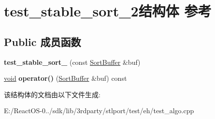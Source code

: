 \hypertarget{structtest__stable__sort__2}{}\section{test\+\_\+stable\+\_\+sort\+\_\+2结构体 参考}
\label{structtest__stable__sort__2}
\subsection*{Public 成员函数}
\begin{DoxyCompactItemize}
\item 
\mbox{\label{structtest__stable__sort__2_a55782d01e475b58a440b69eed7bc63c5}} 
{\bfseries test\+\_\+stable\+\_\+sort\+\_} (const \hyperlink{struct_sort_buffer}{Sort\+Buffer} \&buf)
\item 
\mbox{\label{structtest__stable__sort__2_a0bed304901fde94d605bf1c1e7b0079e}} 
\hyperlink{interfacevoid}{void} {\bfseries operator()} (\hyperlink{struct_sort_buffer}{Sort\+Buffer} \&buf) const
\end{DoxyCompactItemize}


该结构体的文档由以下文件生成\+:\begin{DoxyCompactItemize}
\item 
E\+:/\+React\+O\+S-\/0../sdk/lib/3rdparty/stlport/test/eh/test\+\_\+algo.\+cpp\end{DoxyCompactItemize}
